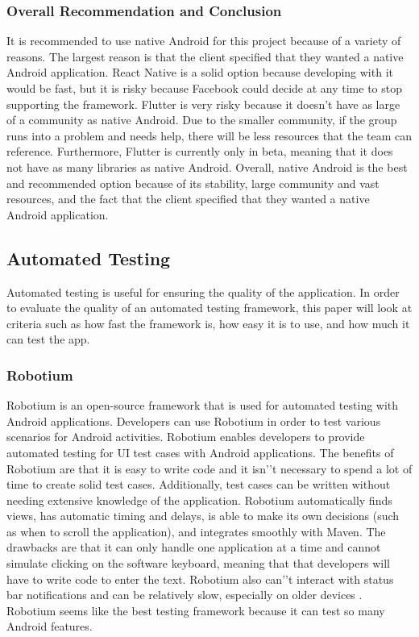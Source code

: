 \documentclass[onecolumn, draftclsnofoot,10pt, compsoc]{IEEEtran}
\begin{document}
\subsubsection{Overall Recommendation and Conclusion}
It is recommended to use native Android for this project because of a variety of reasons. The largest reason is that the client specified that they wanted a native Android application. React Native is a solid option because developing with it would be fast, but it is risky because Facebook could decide at any time to stop supporting the framework. Flutter is very risky because it doesn't have as large of a community as native Android. Due to the smaller community, if the group runs into a problem and needs help, there will be less resources that the team can reference. Furthermore, Flutter is currently only in beta, meaning that it does not have as many libraries as native Android. Overall, native Android is the best and recommended option because of its stability, large community and vast resources, and the fact that the client specified that they wanted a native Android application.

\subsection{Automated Testing}
Automated testing is useful for ensuring the quality of the application. In order to evaluate the quality of an automated testing framework, this paper will look at criteria such as how fast the framework is, how easy it is to use, and how much it can test the app.

\subsubsection{Robotium}
Robotium is an open-source framework that is used for automated testing with Android applications. Developers can use Robotium in order to test various scenarios for Android activities. Robotium enables developers to provide automated testing for UI test cases with Android applications. The benefits of Robotium are that it is easy to write code and it isn'’t necessary to spend a lot of time to create solid test cases. Additionally, test cases can be written without needing extensive knowledge of the application. Robotium automatically finds views, has automatic timing and delays, is able to make its own decisions (such as when to scroll the application), and integrates smoothly with Maven. The drawbacks are that it can only handle one application at a time and cannot simulate clicking on the software keyboard, meaning that that developers will have to write code to enter the text. Robotium also can'’t interact with status bar notifications and can be relatively slow, especially on older devices \cite{W-Robotium}. Robotium seems like the best testing framework because it can test so many Android features.
\end{document}
